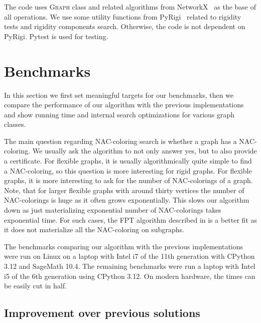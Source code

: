 The code uses \textsc{Graph} class and related algorithms from NetworkX~\cite{networkx}
as the base of all operations. We use some utility functions from PyRigi~\cite{pyrigi}
related to rigidity tests and rigidity components search.
Otherwise, the code is not dependent on PyRigi.
Pytest is used for testing.

\section{Benchmarks}

In this section we first set meaningful targets for our benchmarks,
then we compare the performance of our algorithm with the previous implementations
and show running time and internal search optimizations for various graph classes.

The main question regarding NAC-coloring search is whether a graph has a NAC-coloring.
We usually ask the algorithm to not only answer yes, but to also provide a certificate.
For flexible graphs, it is usually algorithmically quite simple to find a NAC-coloring,
so this question is more interesting for rigid graphs.
For flexible graphs, it is more interesting to ask for the number of NAC-colorings
of a graph.
Note, that for larger flexible graphs with around thirty vertices
the number of NAC-colorings is huge as it often grows exponentially.
This slows our algorithm down as just materializing exponential
number of NAC-colorings takes exponential time.
For such cases, the FPT algorithm described in 
is a better fit as it does not materialize all the NAC-coloring on subgraphs.

The benchmarks comparing our algorithm with the previous implementations
were run on Linux on a laptop with Intel i7 of the 11th generation
with CPython 3.12 and SageMath 10.4.
The remaining benchmarks were run a laptop with Intel i5 of the 6th generation
using CPython 3.12.
On modern hardware, the times can be easily cut in half.

\subsection{Improvement over previous solutions}

